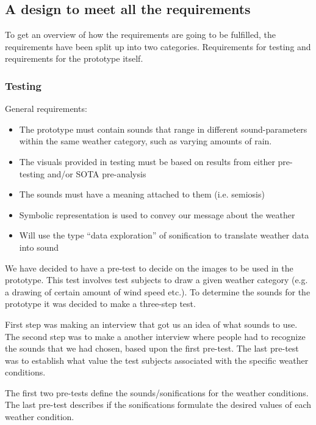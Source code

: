\subsection{A design to meet all the requirements} %
\label{sub:a_design_to_meet_all_the_requirements}

To get an overview of how the requirements are going to be fulfilled, the requirements have been split up into two categories. Requirements for testing and requirements for the prototype itself.

\subsubsection{Testing} %
\label{ssub:testing}

General requirements:

\begin{itemize}
    \item The prototype must contain sounds that range in different sound-parameters within the same weather category, such as varying amounts of rain.
    \item The visuals provided in testing must be based on results from either pre-testing and/or SOTA pre-analysis
    \item The sounds must have a meaning attached to them (i.e. semiosis)
    \item Symbolic representation is used to convey our message about the weather
    \item Will use the type “data exploration” of sonification to translate weather data into sound
\end{itemize}

We have decided to have a pre-test to decide on the images to be used in the prototype. 
This test involves test subjects to draw a given weather category (e.g. a drawing of certain amount of wind speed etc.). 
To determine the sounds for the prototype it was decided to make a three-step test. 

First step was making an interview that got us an idea of what sounds to use. 
The second step was to make a another interview where people had to recognize the sounds that we had chosen, based upon the first pre-test. 
The last pre-test was to establish what value the test subjects associated with the specific weather conditions. 

The first two pre-tests define the sounds/sonifications for the weather conditions. 
The last pre-test describes if the sonifications formulate the desired values of each weather condition.

